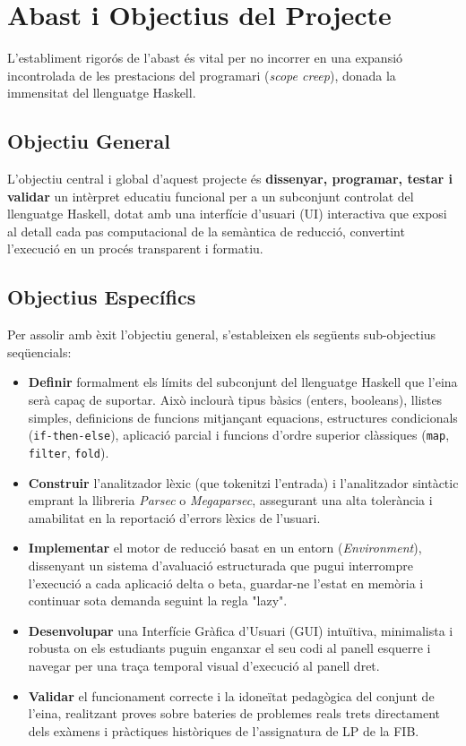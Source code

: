 \section{Abast i Objectius del Projecte}

L'establiment rigorós de l'abast és vital per no incorrer en una expansió incontrolada de les prestacions del programari (\textit{scope creep}), donada la immensitat del llenguatge Haskell.

\subsection{Objectiu General}
L'objectiu central i global d'aquest projecte és \textbf{dissenyar, programar, testar i validar} un intèrpret educatiu funcional per a un subconjunt controlat del llenguatge Haskell, dotat amb una interfície d'usuari (UI) interactiva que exposi al detall cada pas computacional de la semàntica de reducció, convertint l'execució en un procés transparent i formatiu.

\subsection{Objectius Específics}
Per assolir amb èxit l'objectiu general, s'estableixen els següents sub-objectius seqüencials:
\begin{itemize}
    \item \textbf{Definir} formalment els límits del subconjunt del llenguatge Haskell que l'eina serà capaç de suportar. Això inclourà tipus bàsics (enters, booleans), llistes simples, definicions de funcions mitjançant equacions, estructures condicionals (\texttt{if-then-else}), aplicació parcial i funcions d'ordre superior clàssiques (\texttt{map}, \texttt{filter}, \texttt{fold}).
    \item \textbf{Construir} l'analitzador lèxic (que tokenitzi l'entrada) i l'analitzador sintàctic emprant la llibreria \textit{Parsec} o \textit{Megaparsec}, assegurant una alta tolerància i amabilitat en la reportació d'errors lèxics de l'usuari.
    \item \textbf{Implementar} el motor de reducció basat en un entorn (\textit{Environment}), dissenyant un sistema d'avaluació estructurada que pugui interrompre l'execució a cada aplicació delta o beta, guardar-ne l'estat en memòria i continuar sota demanda seguint la regla "lazy".
    \item \textbf{Desenvolupar} una Interfície Gràfica d'Usuari (GUI) intuïtiva, minimalista i robusta on els estudiants puguin enganxar el seu codi al panell esquerre i navegar per una traça temporal visual d'execució al panell dret.
    \item \textbf{Validar} el funcionament correcte i la idoneïtat pedagògica del conjunt de l'eina, realitzant proves sobre bateries de problemes reals trets directament dels exàmens i pràctiques històriques de l'assignatura de LP de la FIB.
\end{itemize}

